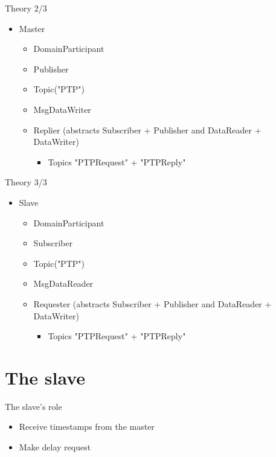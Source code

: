 \documentclass[compressed, presentation, notheorems, 12pt]{beamer}
\begin{document}
\begin{frame}{Theory 2/3}
\begin{itemize}
	\item Master
	\begin{itemize}
		\item DomainParticipant
		\item  Publisher
		\item Topic("PTP")
		\item MsgDataWriter
		\item Replier (abstracts Subscriber + Publisher and DataReader + DataWriter)
		\begin{itemize}
			\item  Topics "PTPRequest" + "PTPReply"
		\end{itemize}
	\end{itemize}
\end{itemize}
\end{frame}



\begin{frame}{Theory 3/3}
\begin{itemize}
	\item Slave
	\begin{itemize}
		\item DomainParticipant
		\item  Subscriber
		\item Topic("PTP")
		\item MsgDataReader
		\item Requester (abstracts Subscriber + Publisher and DataReader + DataWriter)
		\begin{itemize}
			\item  Topics "PTPRequest" + "PTPReply"
		\end{itemize}
	\end{itemize}
\end{itemize}
\end{frame}
	
\section{The slave}
	\begin{frame}{The slave's role}	

	\begin{itemize}
		\item Receive timestamps from the master
		\item Make delay request
	\end{itemize}
	
	\end{frame}
\end{document}
